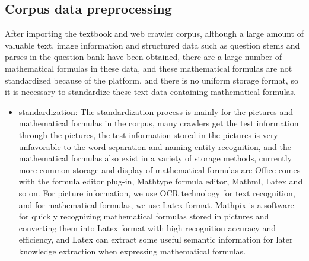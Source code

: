 \subsection{Corpus data preprocessing}
After importing the textbook and web crawler corpus, although a large amount of valuable text, image information and structured data such as question stems and parses in the question bank have been obtained, there are a large number of mathematical formulas in these data, and these mathematical formulas are not standardized because of the platform, and there is no uniform storage format, so it is necessary to standardize these text data containing mathematical formulas.



\begin{itemize}
	\item standardization: The standardization process is mainly for the pictures and mathematical formulas in the corpus, many crawlers get the test information through the pictures, the test information stored in the pictures is very unfavorable to the word separation and naming entity recognition, and the mathematical formulas also exist in a variety of storage methods, currently more common storage and display of mathematical formulas are Office comes with the formula editor plug-in, Mathtype formula editor, Mathml, Latex and so on. For picture information, we use OCR technology for text recognition, and for mathematical formulas, we use Latex format. Mathpix is a software for quickly recognizing mathematical formulas stored in pictures and converting them into Latex format with high recognition accuracy and efficiency, and Latex can extract some useful semantic information for later knowledge extraction when expressing mathematical formulas.

\end{itemize}
